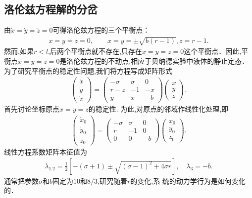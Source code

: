 \subsection{洛伦兹方程解的分岔}

由$\dot{x}=\dot{y}=\dot{z}=0$可得洛伦兹方程的三个平衡点：
\begin{align}
x=y=z=0,\qquad x=y=\pm\sqrt{b(r-1)}, z=r-1.
\end{align}
然而,如果$r<l$,后两个平衡点就不存在,只存在$x=y=z=0$这个平衡点．因此,平衡点$x=y=z=0$是洛伦兹方程的不动点,相应于贝纳德实验中液体的静止定态．为了研究平衡点的稳定性问题,我们将方程写成矩阵形式
\begin{align}
\left(\begin{array}{l}
\dot{x} \\
\dot{y} \\
\dot{z}
\end{array}\right)=\left(\begin{array}{ccc}
-\sigma & \sigma & 0 \\
r-z & -1 & -x \\
y & x & -b
\end{array}\right)\left(\begin{array}{l}
x \\
y \\
z
\end{array}\right) .
\end{align}
首先讨论坐标原点$x=y=z$的稳定性. 为此,对原点的邻域作线性化处理,即
\begin{align}
\left(\begin{array}{l}
\dot{x}_{0} \\
\dot{y}_{0} \\
\dot{z}_{0}
\end{array}\right)=\left(\begin{array}{ccc}
-\sigma & \sigma & 0 \\
r & -1 & 0 \\
0 & 0 & -b
\end{array}\right)\left(\begin{array}{l}
x_{0} \\
y_{0} \\
z_{0}
\end{array}\right).
\end{align}
线性方程系数矩阵本征值为
\begin{align}
\lambda_{1.2}=\frac{1}{2}\left[-(\sigma+1) \pm \sqrt{(\sigma-1)^{2}+4 \sigma r}\right], \quad \lambda_{3}=-b.
\end{align}
通常把参数$\sigma$和$b$固定为$10$和$8/3$,研究随着$r$的变化,系
统的动力学行为是如何变化的．

